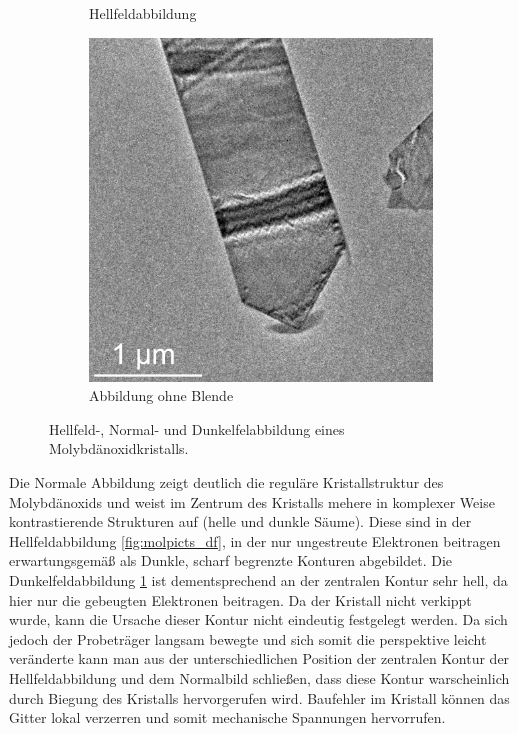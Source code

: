 \documentclass[slug=TEM, room=IFW, supervisor=?, coursedate=23.\ 01.\ 2020]{../../Lab_Report_LaTeX/lab_report}
\begin{document}
\begin{figure}[htp]
\begin{subfigure}{.3\textwidth}
    \caption{Hellfeldabbildung}
    \label{fig:molpicts_hf}
  \end{subfigure}
  \begin{subfigure}{.3\textwidth}
    \includegraphics[width=\textwidth]{../messungen/molybdaen/auswertung/mol_ohne_BLENDE_m.jpg}
    \caption{Abbildung ohne Blende}
    \label{fig:molpicts_n}
  \end{subfigure}
  \caption{Hellfeld-, Normal- und Dunkelfelabbildung eines Molybd\"anoxidkristalls.}
  \label{fig:molpicts}
\end{figure}

Die Normale Abbildung zeigt deutlich die regul\"are Kristallstruktur
des Molybdänoxids und weist im Zentrum des Kristalls mehere in
komplexer Weise kontrastierende Strukturen auf (helle und dunkle
S\"aume). Diese sind in der Hellfeldabbildung \ref{fig:molpicts_df},
in der nur ungestreute Elektronen beitragen erwartungsgem\"a\ss{} als
Dunkle, scharf begrenzte Konturen abgebildet. Die Dunkelfeldabbildung
\ref{fig:molpicts_hf} ist dementsprechend an der zentralen Kontur sehr
hell, da hier nur die gebeugten Elektronen beitragen. Da der Kristall
nicht verkippt wurde, kann die Ursache dieser Kontur nicht eindeutig
festgelegt werden. Da sich jedoch der Probetr\"ager langsam bewegte
und sich somit die perspektive leicht ver\"anderte kann man aus der
unterschiedlichen Position der zentralen Kontur der Hellfeldabbildung
und dem Normalbild schließen, dass diese Kontur warscheinlich durch
Biegung des Kristalls hervorgerufen wird. Baufehler im Kristall
k\"onnen das Gitter lokal verzerren und somit mechanische Spannungen
hervorrufen.
\end{document}
